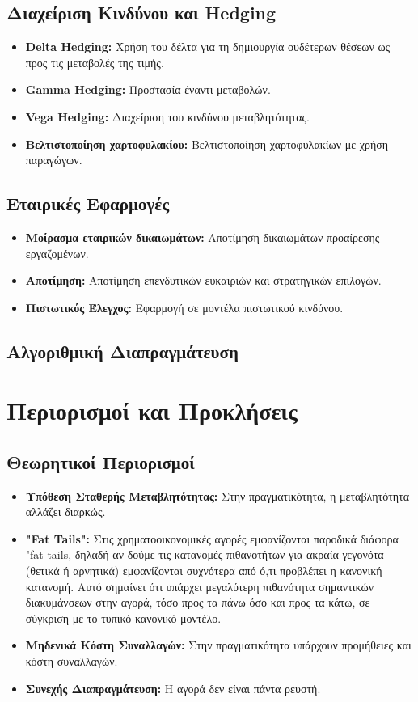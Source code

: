 \subsection{Διαχείριση Κινδύνου και Hedging}

\begin{itemize}
  \item \textbf{Delta Hedging:} Χρήση του δέλτα για τη δημιουργία ουδέτερων θέσεων ως προς τις μεταβολές της τιμής.
  \item \textbf{Gamma Hedging:} Προστασία έναντι μεταβολών.
  \item \textbf{Vega Hedging:} Διαχείριση του κινδύνου μεταβλητότητας.
  \item \textbf{Βελτιστοποίηση χαρτοφυλακίου:} Βελτιστοποίηση χαρτοφυλακίων με χρήση παραγώγων.
\end{itemize}

\subsection{Εταιρικές Εφαρμογές}

\begin{itemize}
  \item \textbf{Μοίρασμα εταιρικών δικαιωμάτων:} Αποτίμηση δικαιωμάτων προαίρεσης εργαζομένων.
  \item \textbf{Αποτίμηση:} Αποτίμηση επενδυτικών ευκαιριών και στρατηγικών επιλογών.
  \item \textbf{Πιστωτικός Έλεγχος:} Εφαρμογή σε μοντέλα πιστωτικού κινδύνου.
\end{itemize}

\subsection{Αλγοριθμική Διαπραγμάτευση}

\section{Περιορισμοί και Προκλήσεις}

\subsection{Θεωρητικοί Περιορισμοί}

\begin{itemize}
  \item \textbf{Υπόθεση Σταθερής Μεταβλητότητας:} Στην πραγματικότητα, η μεταβλητότητα αλλάζει διαρκώς.
  \item \textbf{"Fat Tails":} Στις χρηματοοικονομικές αγορές εμφανίζονται παροδικά διάφορα "fat tails, δηλαδή αν δούμε τις 
  κατανομές πιθανοτήτων για ακραία γεγονότα (θετικά ή αρνητικά)  εμφανίζονται συχνότερα από ό,τι προβλέπει η κανονική κατανομή. Αυτό σημαίνει ότι υπάρχει μεγαλύτερη πιθανότητα σημαντικών 
  διακυμάνσεων στην αγορά, τόσο προς τα πάνω όσο και προς τα κάτω, σε σύγκριση με το τυπικό κανονικό μοντέλο.
  \item \textbf{Μηδενικά Κόστη Συναλλαγών:} Στην πραγματικότητα υπάρχουν προμήθειες και κόστη συναλλαγών.
  \item \textbf{Συνεχής Διαπραγμάτευση:} Η αγορά δεν είναι πάντα ρευστή.
\end{itemize}

